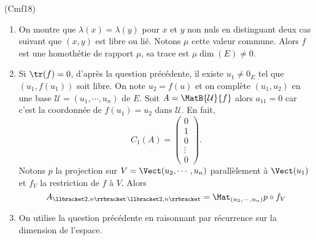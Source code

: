 \begin{tiny}(Cmf18)\end{tiny}
\begin{enumerate}
  \item On montre que $\lambda(x)= \lambda(y)$ pour $x$ et $y$ non nuls en distinguant deux cas suivant que $(x,y)$ est libre ou lié. Notons $\mu$ cette valeur commune. Alors $f$ est une homothétie de rapport $\mu$, sa trace est $\mu \dim(E)\neq 0$.
  \item Si $\tr(f) = 0$, d'après la question précédente, il existe $u_1\neq 0_E$ tel que $(u_1,f(u_1))$ soit libre. On note $u_2 = f(u)$ et on complète $(u_1,u_2)$ en une base $\mathcal{U} = (u_1,\cdots,u_n)$ de $E$. Soit $A=\MatB{\mathcal{U}}{f}$ alors $a_{1 1} = 0$ car c'est la coordonnée de $f(u_1)=u_2$ dans $\mathcal{U}$. En fait,
\[
  C_1(A) =
  \begin{pmatrix}
    0 \\ 1 \\ 0 \\ \vdots \\ 0
  \end{pmatrix} .
\]
Notons $p$ la projection sur $V = \Vect(u_2,\cdots,u_n)$ parallèlement à $\Vect(u_1)$ et $f_V$ la restriction de $f$ à $V$. Alors
\[
  A_{\llbracket 2,n\rrbracket\,\llbracket 2,n\rrbracket} = \Mat_{(u_2,\cdots,u_n)}{p\circ f_V}
\]

  \item On utilise la question précédente en raisonnant par récurrence sur la dimension de l'espace.
\end{enumerate}

